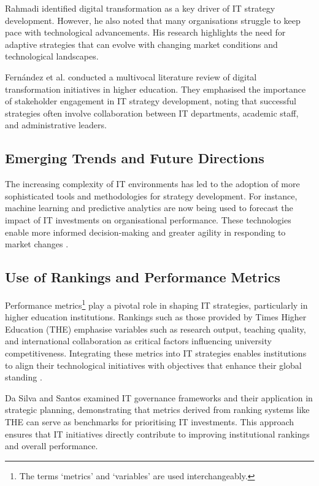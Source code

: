 \documentclass[conference]{IEEEtran}
\begin{document}
Rahmadi \cite{rahmadi2024research} identified digital transformation as a key driver of IT strategy development. However, he also noted that many organisations struggle to keep pace with technological advancements. His research highlights the need for adaptive strategies that can evolve with changing market conditions and technological landscapes.

Fernández et al. \cite{fernandez2023digital} conducted a multivocal literature review of digital transformation initiatives in higher education. They emphasised the importance of stakeholder engagement in IT strategy development, noting that successful strategies often involve collaboration between IT departments, academic staff, and administrative leaders.

\subsection{Emerging Trends and Future Directions}

The increasing complexity of IT environments has led to the adoption of more sophisticated tools and methodologies for strategy development. For instance, machine learning and predictive analytics are now being used to forecast the impact of IT investments on organisational performance. These technologies enable more informed decision-making and greater agility in responding to market changes \cite{digitalsystems2022strategy}.


\subsection{Use of Rankings and Performance Metrics}

Performance metrics\footnote{The terms `metrics' and `variables' are used interchangeably.} play a pivotal role in shaping IT strategies, particularly in higher education institutions. Rankings such as those provided by Times Higher Education (THE) emphasise variables such as research output, teaching quality, and international collaboration as critical factors influencing university competitiveness. Integrating these metrics into IT strategies enables institutions to align their technological initiatives with objectives that enhance their global standing \cite{times2023methodology}.

Da Silva and Santos \cite{dasilva2014cobit} examined IT governance frameworks and their application in strategic planning, demonstrating that metrics derived from ranking systems like THE can serve as benchmarks for prioritising IT investments. This approach ensures that IT initiatives directly contribute to improving institutional rankings and overall performance.
\end{document}
